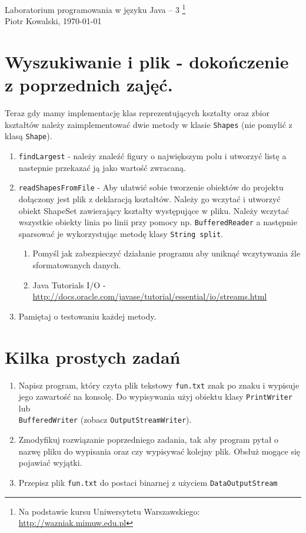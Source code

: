 \documentclass[12pt,letterpaper]{article}
\begin{document}
\linespread{1} %
\small \normalsize %
\begin{flushright}
  Laboratorium programowania w języku Java -- 3 
  \footnote{Na podstawie kursu Uniwersytetu Warszawskiego: \url{http://wazniak.mimuw.edu.pl} }\\
  Piotr Kowalski,
  \today
\end{flushright}

\section{Wyszukiwanie i plik - dokończenie z poprzednich zajęć.}
Teraz gdy mamy implementację klas reprezentujących kształty oraz zbior kształtów należy zaimplementować dwie metody w klasie \verb+Shapes+ (nie pomylić z klasą \verb+Shape+). 

\begin{enumerate}
\item \verb+findLargest+ - należy znaleźć figury o największym polu i utworzyć listę a nastepnie przekazać ją jako wartość zwracaną.
\item \verb+readShapesFromFile+ - Aby ułatwić sobie tworzenie obiektów
  do projektu dołączony jest plik z deklaracją kształtów. Należy go
  wczytać i utworzyć obiekt ShapeSet zawierający kształty występujące
  w pliku. Należy wczytać wszystkie obiekty linia po linii przy pomocy
  np. \verb+BufferedReader+ a następnie sparsować je wykorzystując
  metodę klasy \verb+String split+.
  \begin{enumerate}
  \item Pomyśl jak zabezpieczyć działanie programu aby uniknąć
    wczytywania źle sformatowanych danych.

  \item Java Tutorials I/O - \url{http://docs.oracle.com/javase/tutorial/essential/io/streams.html}
  \end{enumerate}

\item Pamiętaj o testowaniu każdej metody.
\end{enumerate}

\section{Kilka prostych zadań}
\begin{enumerate}
\item Napisz program, który czyta plik tekstowy \verb+fun.txt+ znak po
  znaku i wypisuje jego zawartość na konsolę. Do wypisywania użyj
  obiektu klasy \verb+PrintWriter+ lub \\ \verb+BufferedWriter+
  (zobacz \verb+OutputStreamWriter+).
\item Zmodyfikuj rozwiązanie poprzedniego zadania, tak aby program
  pytał o nazwę pliku do wypisania oraz czy wypisywać kolejny
  plik. Obsłuż mogące się pojawiać wyjątki.
\item Przepisz plik \verb+fun.txt+ do postaci binarnej z użyciem \verb+DataOutputStream+
\end{enumerate}
\end{document}
